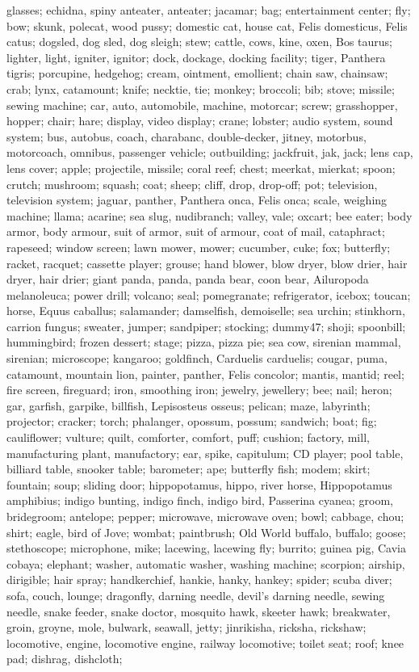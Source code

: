 \documentclass[runningheads]{llncs}
\begin{document}
\begin{enumerate}
glasses; echidna, spiny anteater, anteater; jacamar; bag; entertainment center; fly; bow; skunk, polecat, wood pussy; domestic cat, house cat, Felis domesticus, Felis catus; dogsled, dog sled, dog sleigh; stew; cattle, cows, kine, oxen, Bos taurus; lighter, light, igniter, ignitor; dock, dockage, docking facility; tiger, Panthera tigris; porcupine, hedgehog; cream, ointment, emollient; chain saw, chainsaw; crab; lynx, catamount; knife; necktie, tie; monkey; broccoli; bib; stove; missile; sewing machine; car, auto, automobile, machine, motorcar; screw; grasshopper, hopper; chair; hare; display, video display; crane; lobster; audio system, sound system; bus, autobus, coach, charabanc, double-decker, jitney, motorbus, motorcoach, omnibus, passenger vehicle; outbuilding; jackfruit, jak, jack; lens cap, lens cover; apple; projectile, missile; coral reef; chest; meerkat, mierkat; spoon; crutch; mushroom; squash; coat; sheep; cliff, drop, drop-off; pot; television, television system; jaguar, panther, Panthera onca, Felis onca; scale, weighing machine; llama; acarine; sea slug, nudibranch; valley, vale; oxcart; bee eater; body armor, body armour, suit of armor, suit of armour, coat of mail, cataphract; rapeseed; window screen; lawn mower, mower; cucumber, cuke; fox; butterfly; racket, racquet; cassette player; grouse; hand blower, blow dryer, blow drier, hair dryer, hair drier; giant panda, panda, panda bear, coon bear, Ailuropoda melanoleuca; power drill; volcano; seal; pomegranate; refrigerator, icebox; toucan; horse, Equus caballus; salamander; damselfish, demoiselle; sea urchin; stinkhorn, carrion fungus; sweater, jumper; sandpiper; stocking; dummy47; shoji; spoonbill; hummingbird; frozen dessert; stage; pizza, pizza pie; sea cow, sirenian mammal, sirenian; microscope; kangaroo; goldfinch, Carduelis carduelis; cougar, puma, catamount, mountain lion, painter, panther, Felis concolor; mantis, mantid; reel; fire screen, fireguard; iron, smoothing iron; jewelry, jewellery; bee; nail; heron; gar, garfish, garpike, billfish, Lepisosteus osseus; pelican; maze, labyrinth; projector; cracker; torch; phalanger, opossum, possum; sandwich; boat; fig; cauliflower; vulture; quilt, comforter, comfort, puff; cushion; factory, mill, manufacturing plant, manufactory; ear, spike, capitulum; CD player; pool table, billiard table, snooker table; barometer; ape; butterfly fish; modem; skirt; fountain; soup; sliding door; hippopotamus, hippo, river horse, Hippopotamus amphibius; indigo bunting, indigo finch, indigo bird, Passerina cyanea; groom, bridegroom; antelope; pepper; microwave, microwave oven; bowl; cabbage, chou; shirt; eagle, bird of Jove; wombat; paintbrush; Old World buffalo, buffalo; goose; stethoscope; microphone, mike; lacewing, lacewing fly; burrito; guinea pig, Cavia cobaya; elephant; washer, automatic washer, washing machine; scorpion; airship, dirigible; hair spray; handkerchief, hankie, hanky, hankey; spider; scuba diver; sofa, couch, lounge; dragonfly, darning needle, devil's darning needle, sewing needle, snake feeder, snake doctor, mosquito hawk, skeeter hawk; breakwater, groin, groyne, mole, bulwark, seawall, jetty; jinrikisha, ricksha, rickshaw; locomotive, engine, locomotive engine, railway locomotive; toilet seat; roof; knee pad; dishrag, dishcloth; 
\end{enumerate}
\end{document}
